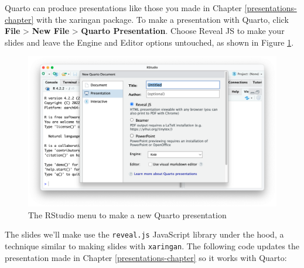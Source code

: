 \documentclass[
]{book}
\begin{document}
Quarto can produce presentations like those you made in Chapter \ref{presentations-chapter} with the xaringan package. To make a presentation with Quarto, click \textbf{File} \textgreater{} \textbf{New File} \textgreater{} \textbf{Quarto Presentation}. Choose Reveal JS to make your slides and leave the Engine and Editor options untouched, as shown in Figure \ref{fig:quarto-new-presentation}.

\begin{figure}
\includegraphics[width=1\linewidth]{assets/quarto-new-presentation} \caption{The RStudio menu to make a new Quarto presentation}\label{fig:quarto-new-presentation}
\end{figure}

The slides we'll make use the \texttt{reveal.js} JavaScript library under the hood, a technique similar to making slides with \texttt{xaringan}. The following code updates the presentation made in Chapter \ref{presentations-chapter} so it works with Quarto:
\end{document}
